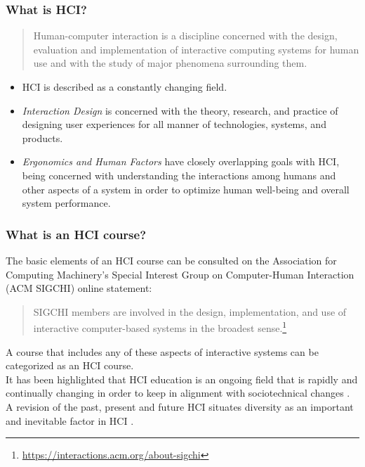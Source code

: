 \documentclass[screen, aspectratio=169]{beamer}
\begin{document}
%
\begin{frame}
\frametitle{What is HCI?}
\begin{quote}
Human-computer interaction is a discipline concerned with the design, evaluation and implementation of interactive computing systems for human use and with the study of major phenomena surrounding them. \cite{Hewett.1992.curricula} 
\end{quote}
\begin{itemize}
\item HCI is described as a constantly changing field.
\item \emph{Interaction Design} is concerned with the theory, research, and practice of designing user experiences for all manner of technologies, systems, and products.~\cite{Preece.et.al.2015.ic-book}
\item \emph{Ergonomics and Human Factors} have closely overlapping goals with HCI, being concerned with understanding the interactions among humans and other aspects of a system in order to optimize human well-being and overall system performance.~\cite{Preece.et.al.2015.ic-book}
\end{itemize}
\end{frame}
%
\begin{frame}
\frametitle{What is an HCI course?}
The basic elements of an HCI course can be consulted on the Association for Computing Machinery's Special Interest Group on Computer-Human Interaction (ACM SIGCHI) online statement: 
\begin{quote}
SIGCHI members are involved in the design, implementation, and use of interactive computer-based systems in the broadest sense.\footnote{\url{https://interactions.acm.org/about-sigchi}} 
\end{quote}
A course that includes any of these aspects of interactive systems can be categorized as an HCI course.\\
It has been highlighted that HCI education is an ongoing field that is rapidly and continually changing in order to keep in alignment with sociotechnical changes \cite{Grandhi.2015.interactions}. A revision of the past, present and future HCI situates diversity as an important and inevitable factor in HCI \cite{Gross.2014:ICHCI}. 
\end{frame}
%
\end{document}
